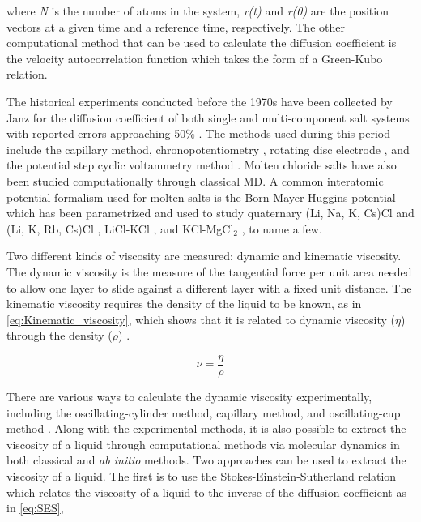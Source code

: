 \documentclass[review]{elsarticle}
\begin{document}
\noindent where \textit{N} is the number of atoms in the system, \textit{r(t)} and \textit{r(0)} are the position vectors at a given time and a reference time, respectively\cite{CHAKRABORTY2015371}. The other computational method that can be used to calculate the diffusion coefficient is the velocity autocorrelation function \cite{rapaport2004art} which takes the form of a Green-Kubo relation.

The historical experiments conducted before the 1970s have been collected by Janz for the diffusion coefficient of both single and multi-component salt systems with reported errors approaching 50$\%$ \cite{janz_Diffusion,janz_osti}. The methods used during this period include the capillary method\cite{bockris1965self}, chronopotentiometry \cite{chemla1976transport}, rotating disc electrode \cite{kuo1975rotating}, and the potential step cyclic voltammetry method \cite{chemla1976transport}. Molten chloride salts have also been studied computationally through classical MD. A common interatomic potential formalism used for molten salts is the Born-Mayer-Huggins potential which has been parametrized and used to study quaternary (Li, Na, K, Cs)Cl and (Li, K, Rb, Cs)Cl \cite{sun2018investigation}, LiCl-KCl \cite{caccamo1980molten,WANG2014262,Bengston2014}, and KCl-MgCl$_2$ \cite{lu2021thermal}, to name a few.



Two different kinds of viscosity are measured: dynamic and kinematic viscosity. The dynamic viscosity is the measure of the tangential force per unit area needed to allow one layer to slide against a different layer with a fixed unit distance. The kinematic viscosity requires the density of the liquid to be known, as in \cref{eq:Kinematic_viscosity}, which shows that it is related to dynamic viscosity ($\eta$) through the density ($\rho$) \cite{Viswanath2007}. 

\begin{equation}
  \label{eq:Kinematic_viscosity}
     \nu = \frac{\eta}{\rho}
\end{equation}

 There are various ways to calculate the dynamic viscosity experimentally, including the oscillating-cylinder method, capillary method, and oscillating-cup method \cite{Viswanath2007}. Along with the experimental methods, it is also possible to extract the viscosity of a liquid through computational methods via molecular dynamics in both classical and \textit{ab initio} methods. Two approaches can be used to extract the viscosity of a liquid. The first is to use the Stokes-Einstein-Sutherland relation \cite{Sutherland, SONG2017462} which relates the viscosity of a liquid to the inverse of the diffusion coefficient as in \cref{eq:SES},
\end{document}
